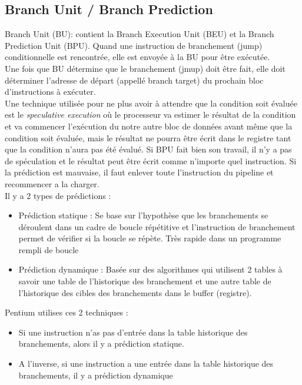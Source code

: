\documentclass[a4paper]{article}
\begin{document}
    \subsection{Branch Unit / Branch Prediction}
    Branch Unit (BU): contient la Branch Execution
    Unit (BEU) et la Branch Prediction Unit (BPU).
    Quand une instruction de branchement (jump)
    conditionnelle est rencontrée, elle est
    envoyée à la BU pour être exécutée.\\
    Une fois que BU détermine que le branchement (jmup) doit être fait, elle doit déterminer l'adresse de départ (appellé branch target) du prochain bloc d'instructions à exécuter.\\
    Une technique utilisée pour ne plus avoir à attendre que la condition soit évaluée est le \emph{speculative execution} où le processeur va estimer le résultat de la condition et
    va commencer l'exécution du notre autre bloc de données avant même que la condition soit évaluée, mais le résultat ne pourra être écrit dans le registre tant que la condition n'aura pas été
    évalué. Si BPU fait bien son travail, il n'y a pas de spéculation et le résultat peut être écrit comme n'importe quel instruction. Si la prédiction est mauvaise, il faut enlever toute
    l'instruction du pipeline et recommencer a la charger. \\[0.2cm] Il y a 2 types de prédictions :

    \begin{itemize}
      \item Prédiction statique : Se base sur l'hypothèse que les branchements se déroulent dans un cadre de boucle répétitive et l'instruction de branchement permet de vérifier si la boucle
      se répète. Très rapide dans un programme rempli de boucle
      \item Prédiction dynamique : Basée sur des algorithmes qui utilisent 2 tables à savoir une table de l'historique des branchement et une autre table de l'historique 
      des cibles des branchements dans le buffer (registre). 
    \end{itemize}

    Pentium utilises ces 2 techniques :
    \begin{itemize}
      \item Si une instruction n'as pas d'entrée dans la table historique des branchements, alors il y a prédiction statique.
      \item A l'inverse, si une instruction a une entrée dans la table historique des branchements, il y a prédiction dynamique
    \end{itemize}
\end{document}
